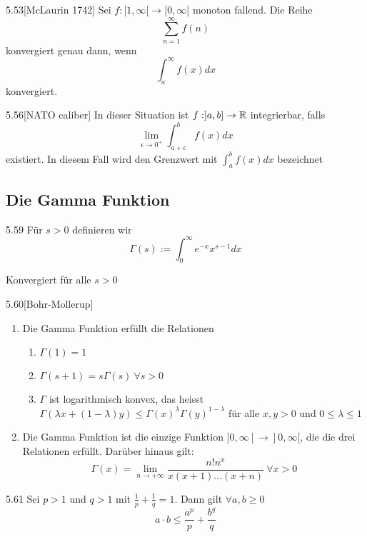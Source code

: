 \begin{satz}{5.53}[McLaurin 1742]
    Sei $f: [1, \infty[ \to [0, \infty[$ monoton fallend. Die Reihe
    \[ \sum_{n=1}^\infty f(n) \]
    konvergiert genau dann, wenn
    \[ \int_a^\infty f(x)dx \]
    konvergiert.
\end{satz}

\begin{definition}{5.56}[NATO caliber]
    In dieser Situation ist $f: ]a, b] \to \mathbb{R}$ integrierbar, falls
    \[ \lim_{\epsilon \to 0^+} \int_{a + \epsilon}^b f(x)dx \]
    existiert. In diesem Fall wird den Grenzwert mit
    $\int_a^b f(x)dx$ bezeichnet
\end{definition}

\subsection{Die Gamma Funktion}

\begin{definition}{5.59}
    Für $s > 0$ definieren wir
    \[ \Gamma(s) := \int_0^\infty e^{-x} x^{s - 1} dx \]

    Konvergiert für alle $s > 0$
\end{definition}


\begin{satz}{5.60}[Bohr-Mollerup]
    \begin{enumerate}
        \item Die Gamma Funktion erfüllt die Relationen
              \begin{enumerate}
                  \item $\Gamma(1) = 1$
                  \item $\Gamma(s + 1) = s\Gamma(s)\ \forall s > 0$
                  \item $\Gamma$ ist logarithmisch konvex, das heisst $\Gamma(\lambda x + (1 - \lambda)y) \le \Gamma(x)^\lambda \Gamma(y)^{1 - \lambda}$
                        für alle $x,y > 0$ und $0 \le \lambda \le 1$
              \end{enumerate}
        \item Die Gamma Funktion ist die einzige Funktion $]0, \infty[ \to ]0, \infty[$, die die drei Relationen erfüllt.
              Darüber hinaus gilt:
              \[ \Gamma(x) = \lim_{n \to +\infty} \frac{n! n^x}{x(x+1)...(x+n)}\ \forall x > 0 \]
    \end{enumerate}
\end{satz}

\begin{lemma}{5.61}
    Sei $p > 1$ und $q > 1$ mit $\frac{1}{p} + \frac{1}{q} = 1$.
    Dann gilt $\forall a,b \ge 0$
    \[ a \cdot b \le \frac{a^p}{p} + \frac{b^q}{q} \]
\end{lemma}


